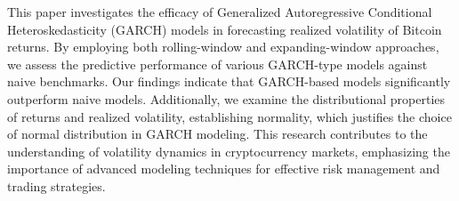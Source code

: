 This paper investigates the efficacy of Generalized Autoregressive Conditional Heteroskedasticity (GARCH) models in forecasting realized volatility of Bitcoin returns. By employing both rolling-window and expanding-window approaches, we assess the predictive performance of various GARCH-type models against naive benchmarks. Our findings indicate that GARCH-based models significantly outperform naive models. Additionally, we examine the distributional properties of returns and realized volatility, establishing normality, which justifies the choice of normal distribution in GARCH modeling. This research contributes to the understanding of volatility dynamics in cryptocurrency markets, emphasizing the importance of advanced modeling techniques for effective risk management and trading strategies.

